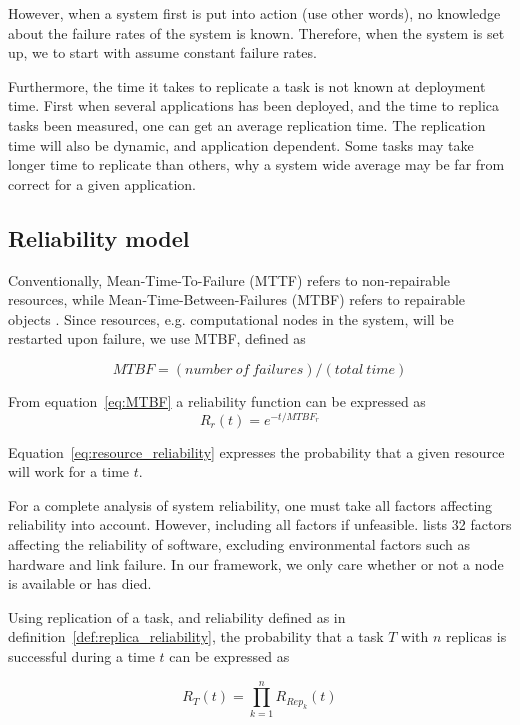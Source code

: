 \documentclass{cslthse-msc}
\begin{document}
However, when a system first is put into action (use other words), no knowledge about the failure rates of the system is known. Therefore, when the system is set up, we to start with assume constant failure rates.

Furthermore, the time it takes to replicate a task is not known at deployment time. First when several applications has been deployed, and the time to replica tasks been measured, one can get an average replication time. The replication time will also be dynamic, and application dependent. Some tasks may take longer time to replicate than others, why a system wide average may be far from correct for a given application.


\subsection{Reliability model}
Conventionally, Mean-Time-To-Failure (MTTF) refers to non-repairable resources, while Mean-Time-Between-Failures (MTBF) refers to repairable objects \cite{effTaskReplMobGrid}. Since resources, e.g. computational nodes in the system, will be restarted upon failure, we use MTBF, defined as

\begin{equation} \label{eq:MTBF}
MTBF = (number\ of\ failures) / (total\ time)
\end{equation}

From equation~\ref{eq:MTBF} a reliability function can be expressed as 
\begin{equation} \label{eq:resource_reliability}
R_{r}(t) = e^{-t/MTBF_{r}}
\end{equation}

Equation~\ref{eq:resource_reliability} expresses the probability that a given resource will work for a time $t$.

For a complete analysis of system reliability, one must take all factors affecting reliability into account. However, including all factors if unfeasible.  \cite{factorsAffectingRel} lists 32 factors affecting the reliability of software, excluding environmental factors such as hardware and link failure. In our framework, we only care whether or not a node is available or has died.


Using replication of a task, and reliability defined as in definition~\ref{def:replica_reliability}, the probability that a task $T$  with $n$ replicas is successful during a time $t$ can be expressed as 

\begin{equation} \label{eq:task_reliability}
R_{T}(t) =  \prod\limits_{k=1}^n R_{Rep_k}(t)
\end{equation}
\end{document}
